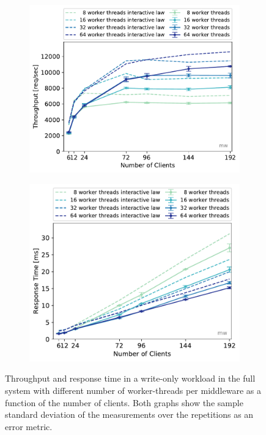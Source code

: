 \documentclass[report.tex]{subfiles}
\begin{document}
\begin{figure}[H]
	\begin{subfigure}[b]{.49\linewidth}
		\centering
		\includegraphics[width=\linewidth]{data/exp41_wo_tp_nc_w.pdf}
	\end{subfigure}\hfill
	\begin{subfigure}[b]{.49\linewidth}
		\centering
		\includegraphics[width=\linewidth]{data/exp41_wo_rt_nc_w.pdf}
	\end{subfigure}%
	\caption{Throughput and response time in a write-only workload in the full system with different number of worker-threads per middleware as a function of the number of clients. Both graphs show the sample standard deviation of the measurements over the repetitions as an error metric.}\label{exp41_tp_rt_nc}
\end{figure}
\end{document}
